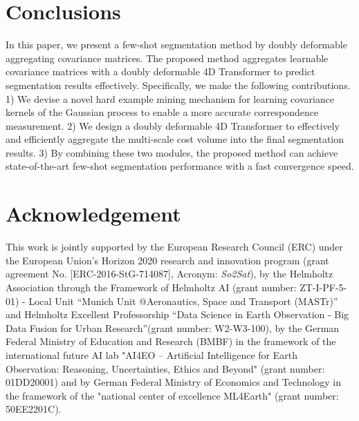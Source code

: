 \documentclass[runningheads]{llncs}
\begin{document}
\section{Conclusions}
In this paper, we present a few-shot segmentation method by doubly deformable aggregating covariance matrices. The proposed method aggregates learnable covariance matrices with a doubly deformable 4D Transformer to predict segmentation results effectively. Specifically, we make the following contributions. 1) We devise a novel hard example mining mechanism for learning covariance kernels of the Gaussian process to enable a more accurate correspondence measurement. 2) We design a doubly deformable 4D Transformer to effectively and efficiently aggregate the multi-scale cost volume into the final segmentation results. 3) By combining these two modules, the proposed method can achieve state-of-the-art few-shot segmentation performance with a fast convergence speed.

\section{Acknowledgement}
This work is jointly supported by the European Research Council (ERC) under the European Union's Horizon 2020 research and innovation program (grant agreement No. [ERC-2016-StG-714087], Acronym: \textit{So2Sat}), by the Helmholtz Association
through the Framework of Helmholtz AI (grant  number:  ZT-I-PF-5-01) - Local Unit ``Munich Unit @Aeronautics, Space and Transport (MASTr)'' and Helmholtz Excellent Professorship ``Data Science in Earth Observation - Big Data Fusion for Urban Research''(grant number: W2-W3-100), by the German Federal Ministry of Education and Research (BMBF) in the framework of the international future AI lab "AI4EO -- Artificial Intelligence for Earth Observation: Reasoning, Uncertainties, Ethics and Beyond" (grant number: 01DD20001) and by German Federal Ministry of Economics and Technology in the framework of the "national center of excellence ML4Earth" (grant number: 50EE2201C).
\clearpage
\end{document}
